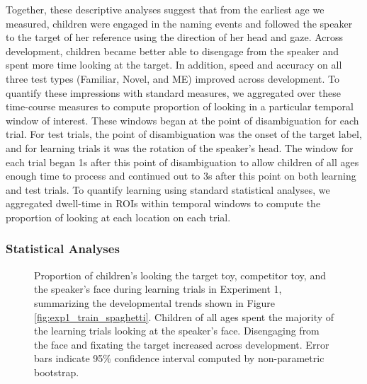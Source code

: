 \documentclass[man,floatsintext]{apa6}
\begin{document}
Together, these descriptive analyses suggest that from the earliest age we measured, children were engaged in the naming events and followed the speaker to the target of her reference using the direction of her head and gaze. Across development, children became better able to disengage from the speaker and spent more time looking at the target. In addition, speed and accuracy on all three test types (Familiar, Novel, and ME) improved across development. To quantify these impressions with standard measures, we aggregated over these time-course measures to compute proportion of looking in a particular temporal window of interest. These windows began at the point of disambiguation for each trial. For test trials, the point of disambiguation was the onset of the target label, and for learning trials it was the rotation of the speaker's head. The window for each trial began 1s after this point of disambiguation to allow children of all ages enough time to process and continued out to 3s after this point on both learning and test trials. To quantify learning using standard statistical analyses, we aggregated dwell-time in ROIs within temporal windows to compute the proportion of looking at each location on each trial.

\subsubsection{Statistical Analyses}

 \begin{figure}[tb]
	\caption{\label{fig:exp1_train} Proportion of children's looking the target toy, competitor toy, and the speaker's face during learning trials in Experiment 1, summarizing the developmental trends shown in Figure \ref{fig:exp1_train_spaghetti}. Children of all ages spent the majority of the learning trials looking at the speaker's face. Disengaging from the face and fixating the target increased across development. Error bars indicate 95\% confidence interval computed by non-parametric bootstrap.}
\end{figure}
\end{document}
